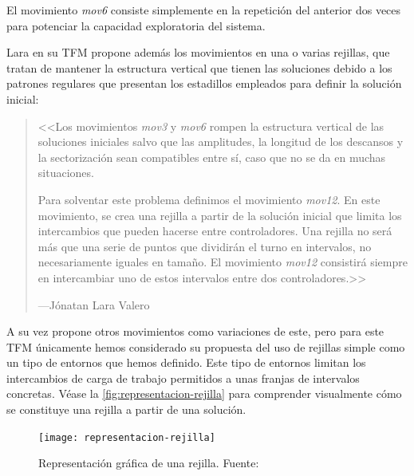 El movimiento \textit{mov6} consiste simplemente en la repetición del anterior dos veces para potenciar la capacidad exploratoria del sistema.

Lara en su TFM propone además los movimientos en una o varias rejillas, que tratan de mantener la estructura vertical que tienen las soluciones debido a los patrones regulares que presentan los estadillos empleados para definir la solución inicial:

\begin{quotation} {\itshape

<<Los movimientos \textit{mov3} y \textit{mov6} rompen la estructura vertical de las soluciones
iniciales salvo que las amplitudes, la longitud de los descansos y la sectorización sean
compatibles entre sí, caso que no se da en muchas situaciones.

Para solventar este problema definimos el movimiento \textit{mov12}. En este movimiento,
se crea una rejilla a partir de la solución inicial que limita los intercambios
que pueden hacerse entre controladores. Una rejilla no será más que una serie de
puntos que dividirán el turno en intervalos, no necesariamente iguales en tamaño. El
movimiento \textit{mov12} consistirá siempre en intercambiar uno de estos intervalos entre
dos controladores.>>}

    \hfill ---Jónatan Lara Valero~\cite{tesis-jonatan}
\end{quotation}

A su vez propone otros movimientos como variaciones de este, pero para este TFM únicamente hemos considerado su propuesta del uso de rejillas simple como un tipo de entornos que hemos definido. Este tipo de entornos limitan los intercambios de carga de trabajo permitidos a unas franjas de intervalos concretas. Véase la \autoref{fig:representacion-rejilla} para comprender visualmente cómo se constituye una rejilla a partir de una solución.

\begin{figure}
    \centering
    \texttt{[image: representacion-rejilla]}
    \caption[Representación gráfica de una rejilla]{Representación gráfica de una rejilla. Fuente:~\cite{tesis-jonatan}}
    \label{fig:representacion-rejilla}
\end{figure}

